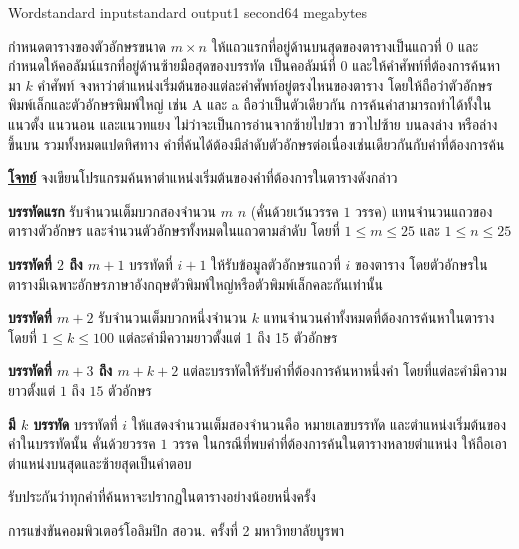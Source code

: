 \documentclass[11pt,a4paper]{article}
\begin{document}
\begin{problem}{Word}{standard input}{standard output}{1 second}{64 megabytes}

กำหนดตารางของตัวอักษรขนาด $m \times n$ ให้แถวแรกที่อยู่ด้านบนสุดของตารางเป็นแถวที่ $0$ และกำหนดให้คอลัมน์แรกที่อยู่ด้านซ้ายมือสุดของบรรทัด เป็นคอลัมน์ที่ $0$ และให้คำศัพท์ที่ต้องการค้นหามา $k$ คำศัพท์ จงหาว่าตำแหน่งเริ่มต้นของแต่ละคำศัพท์อยู่ตรงไหนของตาราง โดยให้ถือว่าตัวอักษรพิมพ์เล็กและตัวอักษรพิมพ์ใหญ่ เช่น A และ a ถือว่าเป็นตัวเดียวกัน การค้นคำสามารถทำได้ทั้งในแนวตั้ง แนวนอน และแนวทแยง ไม่ว่าจะเป็นการอ่านจากซ้ายไปขวา ขวาไปซ้าย บนลงล่าง หรือล่างขึ้นบน รวมทั้งหมดแปดทิศทาง คำที่ค้นได้ต้องมีลำดับตัวอักษรต่อเนื่องเช่นเดียวกันกับคำที่ต้องการค้น

\underline{\textbf{โจทย์}}  จงเขียนโปรแกรมค้นหาตำแหน่งเริ่มต้นของคำที่ต้องการในตารางดังกล่าว 

\InputFile

\textbf{บรรทัดแรก} รับจำนวนเต็มบวกสองจำนวน $m$ $n$ (คั่นด้วยเว้นวรรค $1$ วรรค) แทนจำนวนแถวของตารางตัวอักษร และจำนวนตัวอักษรทั้งหมดในแถวตามลำดับ โดยที่ $1 \leq m \leq 25$ และ $1 \leq n \leq 25$

\textbf{บรรทัดที่ $2$ ถึง $m+1$} บรรทัดที่ $i+1$ ให้รับข้อมูลตัวอักษรแถวที่ $i$ ของตาราง โดยตัวอักษรในตารางมีเฉพาะอักษรภาษาอังกฤษตัวพิมพ์ใหญ่หรือตัวพิมพ์เล็กคละกันเท่านั้น

\textbf{บรรทัดที่ $m+2$} รับจำนวนเต็มบวกหนึ่งจำนวน $k$ แทนจำนวนคำทั้งหมดที่ต้องการค้นหาในตาราง โดยที่ $1 \leq k \leq 100$ แต่ละคำมีความยาวตั้งแต่ 1 ถึง 15 ตัวอักษร

\textbf{บรรทัดที่ $m+3$ ถึง $m+k+2$} แต่ละบรรทัดให้รับคำที่ต้องการค้นหาหนึ่งคำ โดยที่แต่ละคำมีความยาวตั้งแต่ $1$ ถึง $15$ ตัวอักษร 

\OutputFile

\textbf{มี $k$ บรรทัด} บรรทัดที่ $i$ ให้แสดงจำนวนเต็มสองจำนวนคือ หมายเลขบรรทัด และตำแหน่งเริ่มต้นของคำในบรรทัดนั้น คั่นด้วยวรรค $1$ วรรค ในกรณีที่พบคำที่ต้องการค้นในตารางหลายตำแหน่ง ให้ถือเอาตำแหน่งบนสุดและซ้ายสุดเป็นคำตอบ 

รับประกันว่าทุกคำที่ค้นหาจะปรากฏในตารางอย่างน้อยหนึ่งครั้ง

\Examples

\begin{example}
%
\end{example}

\Source

การแข่งขันคอมพิวเตอร์โอลิมปิก สอวน. ครั้งที่ 2 มหาวิทยาลัยบูรพา

\end{problem}
\end{document}
